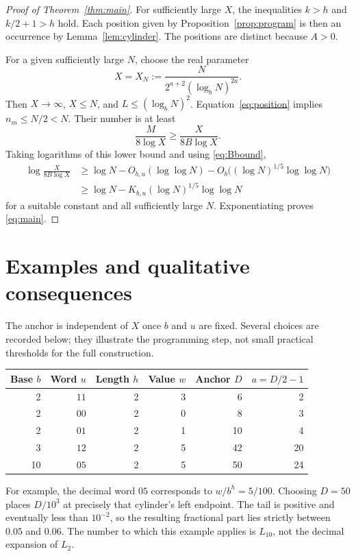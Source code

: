 \documentclass[11pt,a4paper]{article}
\theoremstyle{definition}\newtheorem{definition}[theorem]{Definition}
\theoremstyle{remark}\newtheorem{remark}[theorem]{Remark}
\begin{document}
\begin{proof}[Proof of Theorem~\ref{thm:main}]
For sufficiently large $X$, the inequalities $k>h$ and $k/2+1>h$ hold. Each position given by Proposition~\ref{prop:program} is then an occurrence by Lemma~\ref{lem:cylinder}. The positions are distinct because $A>0$.

For a given sufficiently large $N$, choose the real parameter
\[
 X=X_N:=\frac{N}{2^{a+2}(\log_bN)^{2a}}.
\]
Then $X\to\infty$, $X\le N$, and $L\le(\log_bN)^2$. Equation~\eqref{eq:position} implies $n_m\le N/2<N$. Their number is at least
\[
 \frac{M}{8\log X}\ge\frac{X}{8B\log X}.
\]
Taking logarithms of this lower bound and using \eqref{eq:Bbound},
\begin{align*}
 \log\frac{X}{8B\log X}
 &\ge\log N-O_{b,u}(\log\log N)
    -O_b\bigl((\log N)^{1/5}\log\log N\bigr)\\
 &\ge\log N-K_{b,u}(\log N)^{1/5}\log\log N
\end{align*}
for a suitable constant and all sufficiently large $N$. Exponentiating proves \eqref{eq:main}.
\end{proof}

\section{Examples and qualitative consequences}
The anchor is independent of $X$ once $b$ and $u$ are fixed. Several choices are recorded below; they illustrate the programming step, not small practical thresholds for the full construction.

\begin{center}
\begin{tabular}{rrrrrr}
\toprule
Base $b$ & Word $u$ & Length $h$ & Value $w$ & Anchor $D$ & $a=D/2-1$\\
\midrule
2 & $11$ & 2 & 3 & 6 & 2\\
2 & $00$ & 2 & 0 & 8 & 3\\
2 & $01$ & 2 & 1 & 10 & 4\\
3 & $12$ & 2 & 5 & 42 & 20\\
10 & $05$ & 2 & 5 & 50 & 24\\
\bottomrule
\end{tabular}
\end{center}

For example, the decimal word $05$ corresponds to $w/b^h=5/100$. Choosing $D=50$ places $D/10^3$ at precisely that cylinder's left endpoint. The tail is positive and eventually less than $10^{-2}$, so the resulting fractional part lies strictly between $0.05$ and $0.06$. The number to which this example applies is $L_{10}$, not the decimal expansion of $L_2$.
\end{document}
